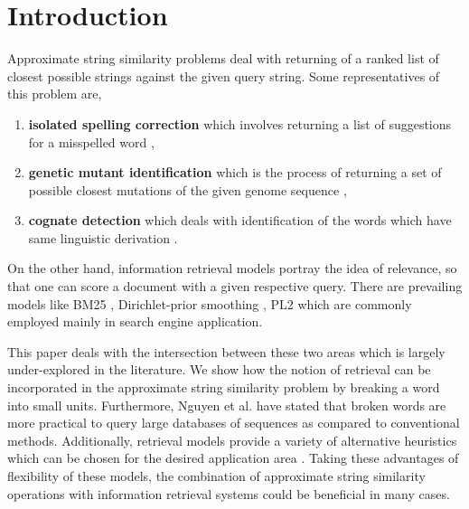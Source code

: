 \chapter{Introduction} %
%
\label{ch:intro}

Approximate string similarity problems deal with returning of a ranked list of closest possible strings against the given query string.
Some representatives of this problem are,
\begin{enumerate}
	\item \textbf{isolated spelling correction} which involves returning a list of suggestions for a misspelled word \cite{kukich1992techniques},
	\item \textbf{genetic mutant identification} which is the process of returning a set of possible closest mutations of the given genome sequence \cite{nguyen2016multiple},
	\item \textbf{cognate detection} which deals with identification of the words which have same linguistic derivation \cite{rama2015automatic}.
\end{enumerate} 

On the other hand, information retrieval models portray the idea of relevance, so that one can score a document with a given respective query.
There are prevailing models like BM25 \cite{bm25}, Dirichlet-prior smoothing \cite{dirich}, PL2 \cite{PL2} which are commonly employed mainly in search engine application.

This paper deals with the intersection between these two areas which is largely under-explored in the literature.
We show how the notion of retrieval can be incorporated in the approximate string similarity problem by breaking a word into small units.
Furthermore, Nguyen et al. \cite{nguyen2016multiple} have stated that broken words are more practical to query large databases of sequences as compared to conventional methods.
Additionally, retrieval models provide a variety of alternative heuristics which can be chosen for the desired application area \cite{Fang}.
Taking these advantages of flexibility of these models, the combination of approximate string similarity operations with information retrieval systems could be beneficial in many cases.

